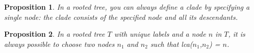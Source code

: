 \documentclass[a4paper,10pt]{report}
\newtheorem{prop}{Proposition}
\theoremstyle{definition}
\begin{document}
\begin{prop}
In a rooted tree, you can always define a clade by specifying a single node: the clade consists of the specified node and all its descendants.
\end{prop}

\begin{prop}
In a rooted tree $T$ with unique labels and a node $n$ in $T$, it is always possible to choose two nodes $n_1$ and $n_2$ such that lca($n_1$,$n_2$) = $n$.
\end{prop}
\end{document}
